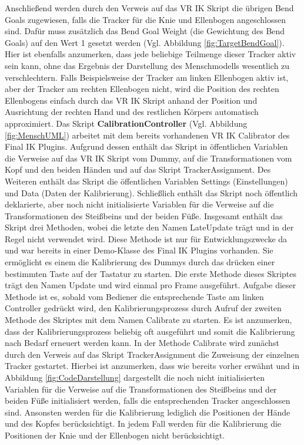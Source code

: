 Anschließend werden durch den Verweis auf das VR IK Skript die übrigen Bend Goals zugewiesen, falls die Tracker für die Knie und Ellenbogen angeschlossen sind. Dafür muss zusätzlich das Bend Goal Weight (die Gewichtung des Bend Goals) auf den Wert 1 gesetzt werden (Vgl. Abbildung \ref{fig:TargetBendGoal}). Hier ist ebenfalls anzumerken, dass jede beliebige Teilmenge dieser Tracker aktiv sein kann, ohne das Ergebnis der Darstellung des Menschmodells wesentlich zu verschlechtern. Falls Beispielsweise der Tracker am linken Ellenbogen aktiv ist, aber der Tracker am rechten Ellenbogen nicht, wird die Position des rechten Ellenbogens einfach durch das VR IK Skript anhand der Position und Ausrichtung der rechten Hand und des restlichen Körpers automatisch approximiert.
\newline\newline
Das Skript \textbf{CalibrationController} (Vgl. Abbildung \ref{fig:MenschUML}) arbeitet mit dem bereits vorhandenen VR IK Calibrator des Final IK Plugins. Aufgrund dessen enthält das Skript in öffentlichen Variablen die Verweise auf das VR IK Skript vom Dummy, auf die Transformationen vom Kopf und den beiden Händen und auf das Skript TrackerAssignment. Des Weiteren enthält das Skript die öffentlichen Variablen Settings (Einstellungen) und Data (Daten der Kalibrierung). Schließlich enthält das Skript noch öffentlich deklarierte, aber noch nicht initialisierte Variablen für die Verweise auf die Transformationen des Steißbeins und der beiden Füße.
\newline
Insgesamt enthält das Skript drei Methoden, wobei die letzte den Namen LateUpdate trägt und in der Regel nicht verwendet wird. Diese Methode ist nur für Entwicklungszwecke da und war bereits in einer Demo-Klasse des Final IK Plugins vorhanden. Sie ermöglicht es einem die Kalibrierung des Dummys durch das drücken einer bestimmten Taste auf der Tastatur zu starten. Die erste Methode dieses Skriptes trägt den Namen Update und wird einmal pro Frame ausgeführt. Aufgabe dieser Methode ist es, sobald vom Bediener die entsprechende Taste am linken Controller gedrückt wird, den Kalibrierungsprozess durch Aufruf der zweiten Methode des Skriptes mit dem Namen Calibrate zu starten. Es ist anzumerken, dass der Kalibrierungsprozess beliebig oft ausgeführt und somit die Kalibrierung nach Bedarf erneuert werden kann.
In der Methode Calibrate wird zunächst durch den Verweis auf das Skript TrackerAssignment die Zuweisung der einzelnen Tracker gestartet. Hierbei ist anzumerken, dass wie bereits vorher erwähnt und in Abbildung \ref{fig:CodeDarstellung} dargestellt die noch nicht initialisierten Variablen für die Verweise auf die Transformationen des Steißbeins und der beiden Füße initialisiert werden, falls die entsprechenden Tracker angeschlossen sind. Ansonsten werden für die Kalibrierung lediglich die Positionen der Hände und des Kopfes berücksichtigt. In jedem Fall werden für die Kalibrierung die Positionen der Knie und der Ellenbogen nicht berücksichtigt.
